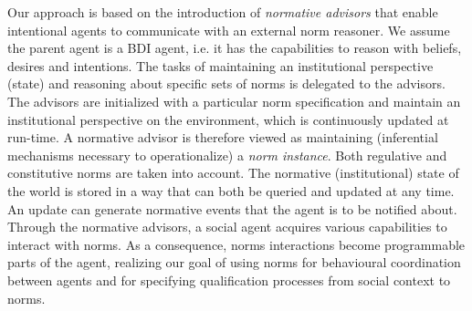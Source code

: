 %



Our approach is based on the introduction of  \emph{normative advisors} that enable intentional agents to communicate with an external norm reasoner. We assume the parent agent is a BDI agent, i.e. it has the capabilities to reason with beliefs, desires and intentions.
%
The tasks of maintaining an institutional perspective (state) and reasoning about specific sets of norms is delegated to the advisors. 
%
%
The advisors are initialized with a particular norm specification and maintain an institutional perspective on the environment, which is continuously updated at run-time. 
%
A normative advisor is therefore viewed as maintaining (inferential mechanisms necessary to operationalize) a \emph{norm instance}.
%
Both regulative and constitutive norms are taken into account.
%
The normative (institutional) state of the world is stored in a way that can both be queried and updated at any time.
%
An update can generate normative events that the agent is to be notified about. 
%
Through the normative advisors, a social agent acquires various capabilities to interact with norms.
%
As a consequence, norms interactions become programmable parts of the agent, realizing our goal of using norms for behavioural coordination between agents and for specifying qualification processes from social context to norms.
